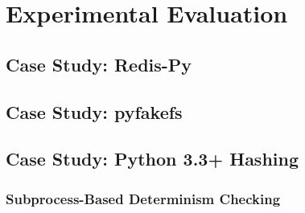 \section{Experimental Evaluation}

\subsection {Case Study: Redis-Py}

\subsection {Case Study: pyfakefs}

\subsection{Case Study: Python 3.3+ Hashing}

\subsubsection{Subprocess-Based Determinism Checking}